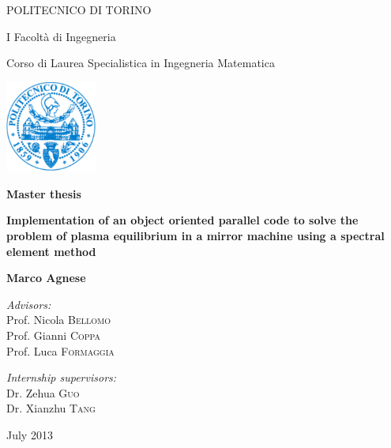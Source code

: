 \begin{titlepage}
\centerline{\LARGE POLITECNICO DI TORINO}
\bigskip
\vspace{1cm}
\centerline{\LARGE I Facolt\`a di Ingegneria}
\centerline{Corso di Laurea Specialistica in Ingegneria Matematica}
\vspace{0.8cm}
\centerline{
\includegraphics[width=3cm,angle=0]{images/MarchioPoli.pdf}}
\vspace{0.8cm}

\centerline{\Large\bfseries\sf Master thesis}
\vspace{0.5cm}
\begin{center}
\textbf{{\LARGE\bfseries Implementation of an object oriented parallel code to solve the problem of plasma equilibrium in a mirror machine using a spectral element method}\\}
\vspace{0.5cm}
\end{center}
\begin{center}
\bfseries\sf\large{Marco Agnese}
\end{center}
\vspace{0.7cm}
\begin{minipage}[t]{0.4\textwidth}
\centering
\textit{Advisors:}\\
\vspace{0.7cm}
{Prof. Nicola \textsc{Bellomo} }\\
\vspace{0.7cm}
{Prof. Gianni \textsc{Coppa} }\\
\vspace{0.7cm}
{Prof. Luca \textsc{Formaggia} }\\
\end{minipage}
\hfill
\begin{minipage}[t]{0.47\textwidth}
\centering
\textit{Internship supervisors:}\\
\vspace{0.7cm}
{Dr. Zehua \textsc{Guo } }\\
\vspace{0.7cm}
{Dr. Xianzhu \textsc{Tang } }\\
\end{minipage}
\vfill
\vspace{1cm}
\centerline{July 2013}
\end{titlepage}

